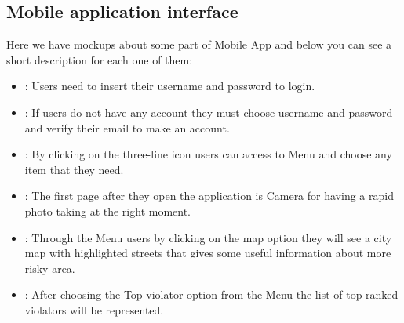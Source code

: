 \documentclass{article}
\begin{document}
	\subsection{Mobile application interface}
	Here we have mockups about some part of Mobile App and below you can see a short description for each one of them:	\begin{itemize}
		\item {}: Users need to insert their username and password to login.
		\item {}: If users do not have any account they must choose username and password and verify their email to make an account.
  		\item {}: By clicking on the three-line icon users can access to Menu and choose any item that they need.
		\item {}: The first page after they open the application is Camera for having a rapid photo taking at the right moment.
		\item {}: Through the Menu users by clicking on the map option they will see a city map with highlighted  streets that gives some useful information about more risky area.
		\item {}: After choosing the Top violator option from the Menu the list of top ranked violators will be represented.
		\end{itemize}   
\end{document}
